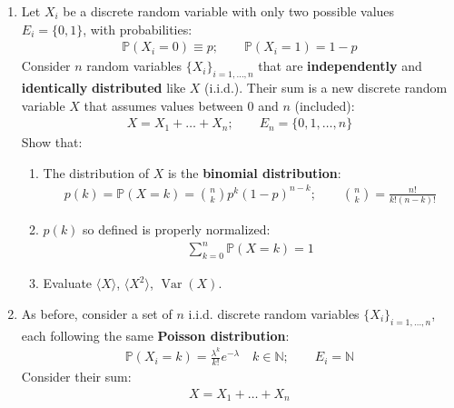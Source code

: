 \documentclass[../../main.tex]{subfiles}
\begin{document}
\begin{exo}\label{ex:moments-discrete}
    \begin{enumerate}[label=\alph*.]
        \item Let $X_i$ be a discrete random variable with only two possible values $E_i=\{0,1\}$, with probabilities:
        \begin{align*}
            \mathbb{P}(X_i=0) \equiv p; \qquad \mathbb{P}(X_i=1) = 1-p    
        \end{align*}
        Consider $n$ random variables $\{X_i\}_{i=1,\dots,n}$ that are \textbf{independently} and \textbf{identically} \textbf{distributed} like $X$ (i.i.d.). Their sum is a new discrete random variable $X$ that assumes values between $0$ and $n$ (included):
        \begin{align*}
            X = X_1 + \dots + X_n; \qquad E_n = \{0,1,\dots, n\}
        \end{align*}
        Show that:
        \begin{enumerate}[label=\roman*.]
            \item The distribution of $X$ is the \textbf{binomial distribution}:
            \begin{align} \label{eqn:binomial-dist}
                p(k) = \mathbb{P}(X=k) = {n\choose k} p^k (1-p)^{n-k}; \qquad {n\choose k} = \frac{n!}{k! (n-k)!} 
            \end{align}
            \item $p(k)$ so defined is properly normalized:
            \begin{align*}
                \sum_{k=0}^n \mathbb{P}(X=k) = 1
            \end{align*}
            \item Evaluate $\langle X \rangle$, $\langle X^2 \rangle$, $\operatorname{Var}(X)$. 
        \end{enumerate}
        \item As before, consider a set of $n$ i.i.d. discrete random variables $\{X_i\}_{i=1,\dots,n}$, each following the same \textbf{Poisson distribution}:
        \begin{align} \label{eqn:poisson-dist}
            \mathbb{P}(X_i = k) = \frac{\lambda^k}{k!} e^{-\lambda} \quad k \in \mathbb{N}; \qquad E_i = \mathbb{N} 
        \end{align}  
        Consider their sum:
        \begin{align*}
            X=X_1 + \dots + X_n
        \end{align*}

\end{enumerate}
\end{exo}
\end{document}
